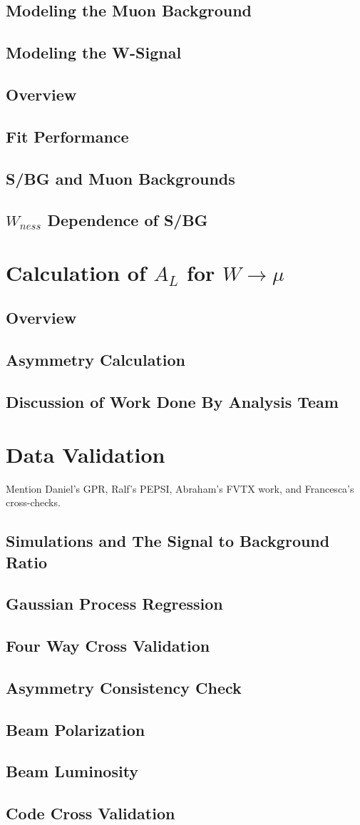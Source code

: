 \subsection{Modeling the Muon Background}
\subsection{Modeling the W-Signal}
\subsection{Overview}
\subsection{Fit Performance}
\subsection{S/BG and Muon Backgrounds}
\label{ssec:sbr}
\subsection{$W_{ness}$ Dependence of S/BG}
\section{Calculation of $A_{L}$ for $W\rightarrow\mu$}
\subsection{Overview}
\subsection{Asymmetry Calculation}
\subsection{Discussion of Work Done By Analysis Team}
\section{Data Validation}
Mention Daniel's GPR, Ralf's PEPSI, Abraham's FVTX work, and Francesca's cross-checks.
\subsection{Simulations and The Signal to Background Ratio}
\subsection{Gaussian Process Regression}
\subsection{Four Way Cross Validation}
\subsection{Asymmetry Consistency Check}
\subsection{Beam Polarization}
\subsection{Beam Luminosity}
\subsection{Code Cross Validation}
